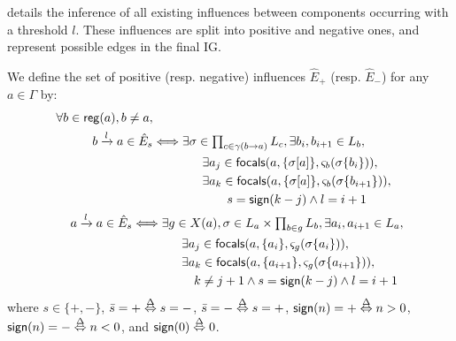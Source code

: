  details the inference of all existing influences between components occurring
with a threshold $l$.
These influences are split into positive and negative ones, and represent possible edges in the final IG.
\begin{proposition}\label{pps:inference-edges}
We define the set of positive (resp. negative) influences $\hat{E}_+$ (resp. $\hat{E}_-$) for any
$a\in\Gamma$ by:
\begin{align}
\begin{split}
\forall b\in\mathsf{reg}({a}), b\neq a, \\
b\xrightarrow l a \in \hat{E}_s & \Longleftrightarrow
 \exists \sigma\in\textstyle\prod_{c\in\gamma(b\rightarrow a)} L_c, \exists b_i,b_{i+1}\in L_b,\\
& \qquad\qquad
        \exists a_{j}\in\mathsf{focals}(a, \{\sigma[a]\}, \varsigma_b(\sigma\{b_i\})), \\
& \qquad\qquad
        \exists a_{k}\in\mathsf{focals}(a, \{\sigma[a]\}, \varsigma_b(\sigma\{b_{i+1}\})), \\
& \qquad\qquad\qquad
                        s = \mathsf{sign}(k - j) \wedge l = i+1
\end{split}
\label{eq:edges-inference-b}
\\
\begin{split}
a \xrightarrow l a \in \hat{E}_s & \Longleftrightarrow
\exists g \in X(a), \sigma \in L_a\times \textstyle\prod_{b\in g} L_b,
			\exists a_i,a_{i+1}\in L_a, \\
& \qquad\qquad
        \exists a_{j}\in\mathsf{focals}(a, \{a_i\}, \varsigma_g(\sigma\{a_i\})), \\
& \qquad\qquad
        \exists a_{k}\in\mathsf{focals}(a, \{a_{i+1}\},  \varsigma_g(\sigma\{a_{i+1}\})), \\
& \qquad\qquad\quad
			k \neq j+1
				\wedge s = \mathsf{sign}(k - j) \wedge l = i+1
\end{split}
\label{eq:edges-inference-a}
\end{align}
where $s \in \{ +, - \}$, $\bar s = + \stackrel{\Delta}\Leftrightarrow s = -$, $\bar s = - \stackrel{\Delta}\Leftrightarrow s = +$,
$\mathsf{sign}(n) = + \stackrel{\Delta}\Leftrightarrow n > 0$,
$\mathsf{sign}(n) = - \stackrel{\Delta}\Leftrightarrow n < 0$,
and $\mathsf{sign}(0) \stackrel{\Delta}\Leftrightarrow 0$.
\end{proposition}

